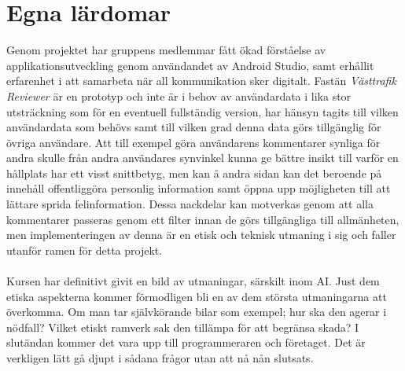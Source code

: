 \documentclass{article}
\begin{document}
\section*{Egna lärdomar}
Genom projektet har gruppens medlemmar fått ökad förståelse av applikationsutveckling genom användandet av Android Studio, samt erhållit erfarenhet i att samarbeta när all kommunikation sker digitalt. Fastän \textit{Västtrafik Reviewer} är en prototyp och inte är i behov av användardata i lika stor utsträckning som för en eventuell fullständig version, har hänsyn tagits till vilken användardata som behövs samt till vilken grad denna data görs tillgänglig för övriga användare. Att till exempel göra användarens kommentarer synliga för andra skulle från andra användares synvinkel kunna ge bättre insikt till varför en hållplats har ett visst snittbetyg, men kan å andra sidan kan det beroende på innehåll offentliggöra personlig information samt öppna upp möjligheten till att lättare sprida felinformation. Dessa nackdelar kan motverkas genom att alla kommentarer passeras genom ett filter innan de görs tillgängliga till allmänheten, men implementeringen av denna är en etisk och teknisk utmaning i sig och faller utanför ramen för detta projekt.
\\\\
Kursen har definitivt givit en bild av utmaningar, särskilt inom AI. Just dem etiska aspekterna kommer förmodligen bli en av dem största utmaningarna att överkomma. Om man tar självkörande bilar som exempel; hur ska den agerar i nödfall? Vilket etiskt ramverk sak den tillämpa för att begränsa skada? I slutändan kommer det vara upp till programmeraren och företaget. Det är verkligen lätt gå djupt i sådana frågor utan att nå nån slutsats.
\end{document}

